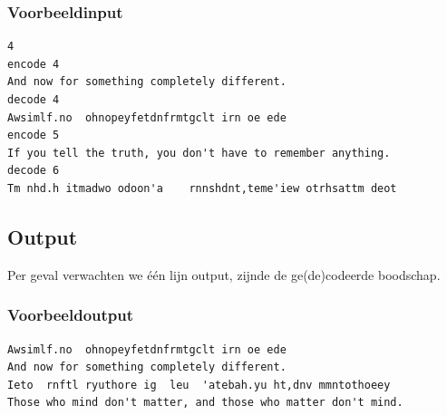 \subsubsection*{Voorbeeldinput}

\begin{verbatim}
4
encode 4
And now for something completely different.
decode 4
Awsimlf.no  ohnopeyfetdnfrmtgclt irn oe ede
encode 5
If you tell the truth, you don't have to remember anything.
decode 6
Tm nhd.h itmadwo odoon'a    rnnshdnt,teme'iew otrhsattm deot 
\end{verbatim}

\subsection*{Output}

Per geval verwachten we \'e\'en lijn output, zijnde de ge(de)codeerde boodschap.

\subsubsection*{Voorbeeldoutput}

\begin{verbatim}
Awsimlf.no  ohnopeyfetdnfrmtgclt irn oe ede
And now for something completely different.
Ieto  rnftl ryuthore ig  leu  'atebah.yu ht,dnv mmntothoeey
Those who mind don't matter, and those who matter don't mind.
\end{verbatim}

